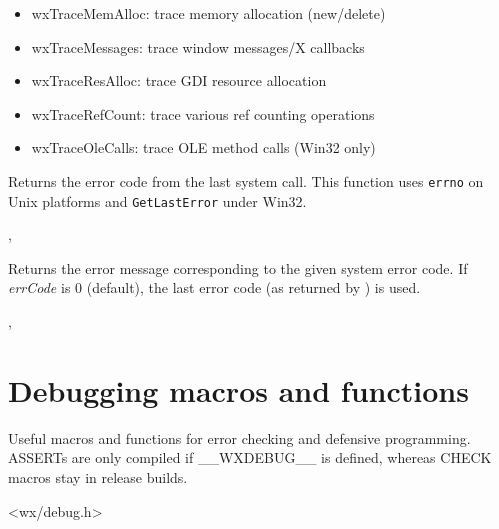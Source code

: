 \begin{itemize}\itemsep=0pt
\item wxTraceMemAlloc: trace memory allocation (new/delete)
\item wxTraceMessages: trace window messages/X callbacks
\item wxTraceResAlloc: trace GDI resource allocation
\item wxTraceRefCount: trace various ref counting operations
\item wxTraceOleCalls: trace OLE method calls (Win32 only)
\end{itemize}

\label{wxsyserrorcode}


Returns the error code from the last system call. This function uses
{\tt errno} on Unix platforms and {\tt GetLastError} under Win32.


,

\label{wxsyserrormsg}


Returns the error message corresponding to the given system error code. If 
{\it errCode} is $0$ (default), the last error code (as returned by 
) is used.


,

\section{Debugging macros and functions}\label{debugmacros}

Useful macros and functions for error checking and defensive programming. ASSERTs are only
compiled if \_\_WXDEBUG\_\_ is defined, whereas CHECK macros stay in release
builds.


<wx/debug.h>

\label{wxonassert}


